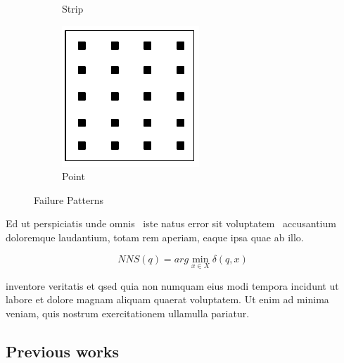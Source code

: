 \begin{figure}
\begin{subfigure}[b]{0.25\textwidth}
        \caption{Strip}
        \label{fig:strip-failure-pattern}
    \end{subfigure}
    \begin{subfigure}[b]{0.25\textwidth}
        \includegraphics[width=\textwidth]{Figures/point-failure-pattern.pdf}
        \caption{Point}
        \label{fig:point-failure-pattern}
    \end{subfigure}
    \caption{Failure Patterns}
    \label{Failure-Patterns}
\end{figure}

Ed ut perspiciatis unde omnis~\cite{Duran1981} iste natus error sit voluptatem~\cite{Deza2009} accusantium doloremque laudantium, totam rem aperiam, eaque ipsa quae ab illo.

\begin{equation}
    NNS(q) = arg \min_{x \in X} \delta(q, x)
\end{equation}

inventore veritatis et qsed quia non numquam eius modi tempora incidunt ut labore et dolore magnam aliquam quaerat voluptatem\cite{hantler1976}. Ut enim ad minima veniam, quis nostrum exercitationem ullamulla pariatur.



\subsection{Previous works}
\label{Previous works}


